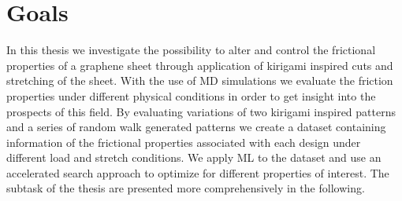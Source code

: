 

\section{Goals} %
In this thesis we investigate the possibility to alter and control the frictional
properties of a graphene sheet through application of kirigami inspired cuts and stretching of the sheet. With the use of \acrshort{MD} simulations we evaluate the friction properties under different physical conditions in order to get insight into the prospects of this field. By evaluating variations of two kirigami inspired patterns and a series of random walk generated patterns we create a dataset containing information of the frictional properties associated with each design under different load and stretch conditions. We apply \acrshort{ML} to the dataset and use an accelerated search approach to optimize for different properties of interest. The subtask of the thesis are presented more comprehensively in the following.
